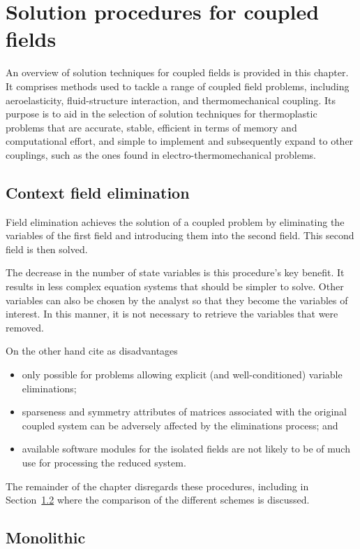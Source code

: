 
\chapter{Solution procedures for coupled fields}

An overview of solution techniques for coupled fields is provided in this chapter.
It comprises methods used to tackle a range of coupled field problems, including aeroelasticity, fluid-structure interaction, and thermomechanical coupling.
Its purpose is to aid in the selection of solution techniques for thermoplastic problems that are accurate, stable, efficient in terms of memory and computational effort, and simple to implement and subsequently expand to other couplings, such as the ones found in electro-thermomechanical problems.

\section{Context field elimination}

Field elimination achieves the solution of a coupled problem by eliminating the variables of the first field and introducing them into the second field.
This second field is then solved.

The decrease in the number of state variables is this procedure's key benefit.
It results in less complex equation systems that should be simpler to solve.
Other variables can also be chosen by the analyst so that they become the variables of interest.
In this manner, it is not necessary to retrieve the variables that were removed. \citep{felippa_staggered_1980}

On the other hand \cite{felippa_staggered_1980} cite as disadvantages
\begin{itemize}
  \item only possible for problems allowing explicit (and well-conditioned) variable eliminations;
  \item sparseness and symmetry attributes of matrices associated with the original coupled system can be adversely affected by the eliminations process; and
  \item available software modules for the isolated fields are not likely to be of much use for processing the reduced system.
\end{itemize}
The remainder of the chapter disregards these procedures, including in Section~\ref{} where the comparison of the different schemes is discussed.

\section{Monolithic}

